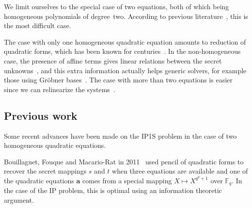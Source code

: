 \documentclass{article}%
\def\F{\mathbb{F}}
\begin{document}
We limit ourselves to the special case of two equations, both of which
being homogeneous polynomials of degree~two. According to previous
literature~\cite{DBLP:conf/eurocrypt/Perret05,DBLP:conf/eurocrypt/FaugereP06,DBLP:conf/pkc/BouillaguetFFP11,DBLP:conf/eurocrypt/BouillaguetFV13},
this is the most difficult case.

The case with only one homogeneous quadratic equation amounts to 
reduction of quadratic forms, which has been known for
centuries~\cite{gauss,lidl1997finite}. In the non-homogeneous case, the
presence of affine terms gives linear relations between the secret
unknowns~\cite{DBLP:conf/eurocrypt/PatarinGC98}, and this extra
information actually helps generic solvers, for example those using
Gröbner bases~\cite{DBLP:conf/eurocrypt/FaugereP06}.
The case with more than two equations is easier since we can relinearize
the systems~\cite{DBLP:conf/pkc/BouillaguetFFP11}.

\subsection*{Previous work}%

Some recent advances have been made on the IP1S problem in the case of
two
homogeneous quadratic equations.


Bouillaguet, Fouque and Macario-Rat in 2011~\cite{DBLP:conf/asiacrypt/BouillaguetFM11} 
used pencil of quadratic forms to recover the secret mappings $s$ and $t$
when three equations are available
and one of the quadratic equations $\bm{a}$ comes from a special mapping $X\mapsto X^{q^\theta+1}$ 
over $\F_q$. In the case of the IP problem, this is optimal using an information theoretic argument.
\end{document}
